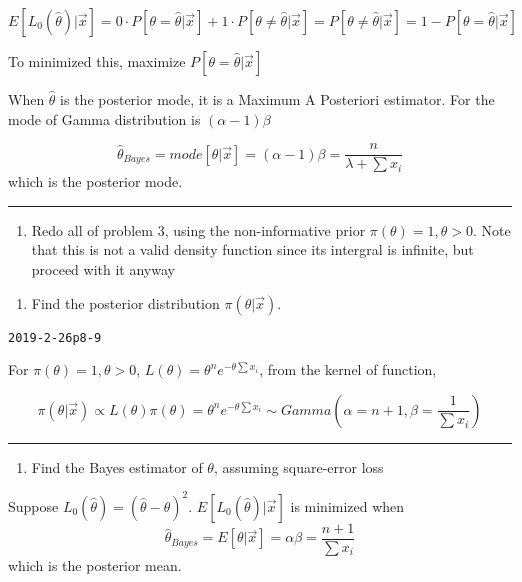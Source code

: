 \documentclass[12pt,]{article}
\providecommand{\tightlist}{%
  \setlength{\itemsep}{0pt}\setlength{\parskip}{0pt}}
\begin{document}
\[E[L_0(\hat\theta)|\vec x]=0\cdot P[\theta=\hat\theta|\vec x]+1\cdot P[\theta\neq\hat\theta|\vec x]=P[\theta\neq\hat\theta|\vec x]=1-P[\theta=\hat\theta|\vec x]\]

To minimized this, maximize \(P[\theta=\hat\theta|\vec x]\)

When \(\hat\theta\) is the posterior mode, it is a Maximum A Posteriori
estimator. For the mode of Gamma distribution is \((\alpha-1)\beta\)

\[\hat\theta_{Bayes}=mode[\theta|\vec x]=(\alpha-1)\beta=\frac{n}{\lambda+\sum x_i}\]
which is the posterior mode.

\begin{center}\rule{0.5\linewidth}{\linethickness}\end{center}

\begin{enumerate}
\def\labelenumi{\arabic{enumi}.}
\setcounter{enumi}{3}
\tightlist
\item
  \textcolor[rgb]{0.5,0.5,0.5}{Redo all of problem 3, using the non-informative prior $\pi(\theta)=1,\theta>0$. Note that this is not a valid density function since its intergral is infinite, but proceed with it anyway}
\end{enumerate}

\begin{enumerate}
\def\labelenumi{\alph{enumi}.}
\tightlist
\item
  \textcolor[rgb]{0.5,0.5,0.5}{Find the posterior distribution $\pi(\theta|\vec x)$.}
\end{enumerate}

\texttt{2019-2-26p8-9}

For \(\pi(\theta)=1,\theta>0\),
\(L(\theta)=\theta^n e^{-\theta\sum x_i}\), from the kernel of function,

\[\pi(\theta|\vec x)\propto L(\theta)\pi(\theta)=\theta^n e^{-\theta\sum x_i}\sim Gamma(\alpha=n+1,\beta=\frac1{\sum x_i})\]

\begin{center}\rule{0.5\linewidth}{\linethickness}\end{center}

\begin{enumerate}
\def\labelenumi{\alph{enumi}.}
\setcounter{enumi}{1}
\tightlist
\item
  \textcolor[rgb]{0.5,0.5,0.5}{Find the Bayes estimator of $\theta$, assuming square-error loss}
\end{enumerate}

Suppose \(L_0(\hat\theta)=(\hat\theta-\theta)^2\).
\(E[L_0(\hat\theta)|\vec x]\) is minimized when
\[\hat\theta_{Bayes}=E[\theta|\vec x]=\alpha\beta=\frac{n+1}{\sum x_i}\]
which is the posterior mean.
\end{document}
